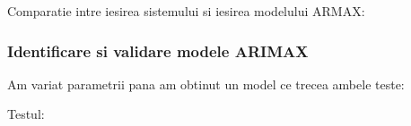 \documentclass[12pt,english]{article}
\begin{document}
Comparatie intre iesirea sistemului si iesirea modelului ARMAX:
\begin{center}
\end{center}

\subsubsection {Identificare si validare modele ARIMAX}
Am variat parametrii pana am obtinut un model ce trecea ambele teste:
\begin{center}
\end{center}

Testul:
\begin{center}
\end{center}
\end{document}
